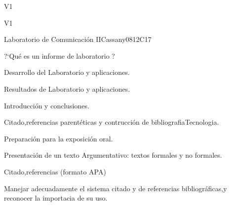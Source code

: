 \begin{syllabus}
\begin{outcomes}{V1}
   \item {}
   \item {}
\end{outcomes}

\begin{competences}{V1}
    \item {}
    \item {}
    \item {}
\end{competences}

\begin{unit}{Laboratorio de Comunicación II}{}{Cassany08}{12}{C17}
   \begin{topics}
      \item ?`Qué es un informe de laboratorio ?
      \item Desarrollo del Laboratorio y aplicaciones.
      \item Resultados de Laboratorio y aplicaciones.
      \item Introducción y conclusiones.
      \item Citado,referencias parentéticas y contrucción de bibliografiaTecnologia.
      \item Preparación para la exposición oral.
      \item Presentación de un texto Argumentativo: textos formales y  no formales.
      \item Citado,referencias (formato APA)
      
   \end{topics}
\begin{learningoutcomes}
      \item Manejar adecuadamente el sistema citado y de referencias bibliográficas,y reconocer la importacia de su uso.
   \end{learningoutcomes}
\end{unit}

\begin{coursebibliography}
\end{coursebibliography}

\end{syllabus}
